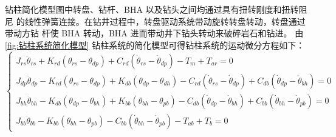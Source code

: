 \documentclass[12pt,hyperref,a4paper,UTF8]{ctexart}
\begin{document}
	
	钻柱简化模型图中转盘、钻杆、BHA 以及钻头之间均通过具有扭转刚度和扭转阻尼 的线性弹簧连接。在钻井过程中，转盘驱动系统带动旋转转盘转动，转盘通过带动方钻 杆使 BHA 转动，BHA 进而带动井下钻头转动来破碎岩石和钻进。
	由\autoref{fig:钻柱系统简化模型} 钻柱系统的简化模型可得钻柱系统的运动微分方程如下：
	\begin{equation}
		\left\{ \begin{array}{l}
			{J_{rs}}{{\ddot \theta }_{rs}} + {K_{rd}}({\theta _{rs}} - {\theta _{dp}}) + {C_{rd}}({{\dot \theta }_{rs}} - {{\dot \theta }_{dp}}) - {T_m} + {T_{ar}} = 0\\
			{J_{dp}}{{\ddot \theta }_{dp}} - {K_{rd}}({\theta _{rs}} - {\theta _{dp}}) + {K_{db}}({\theta _{dp}} - {\theta _{dh}}) - {C_{rd}}({{\dot \theta }_{rs}} - {{\dot \theta }_{dp}}) + {C_{db}}({{\dot \theta }_{dp}} - {{\dot \theta }_{bh}}) = 0\\
			{J_{bh}}{{\ddot \theta }_{bh}} - {K_{db}}({\theta _{dp}} - {\theta _{bh}}) + {K_{bb}}({\theta _{bh}} - {\theta _{pb}}) - {C_{db}}({{\dot \theta }_{dp}} - {{\dot \theta }_{bh}}) + {C_{bb}}({{\dot \theta }_{bh}} - {{\dot \theta }_{pb}}) = 0\\
			{J_{bb}}{{\ddot \theta }_{bb}} - {K_{bb}}({\theta _{bh}} - {\theta _{pb}}) - {C_{bb}}({{\dot \theta }_{bh}} - {{\dot \theta }_{pb}}) - {T_{ab}} + {T_b} = 0
		\end{array} \right.
		\label{eq:钻柱系统的运动微分方程}
	\end{equation}
	
\end{document}
